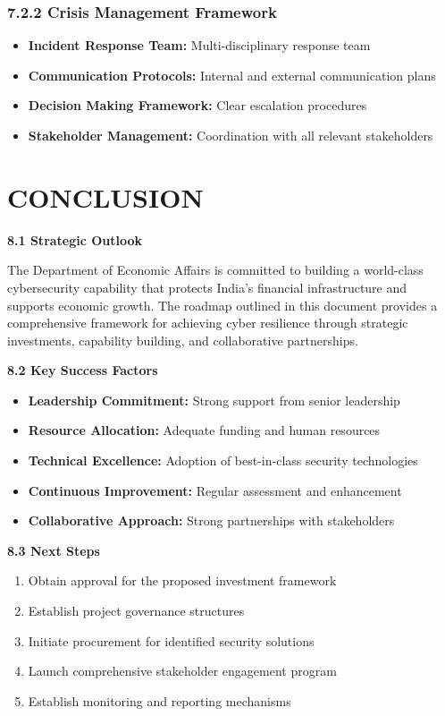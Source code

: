 \documentclass[12pt,a4paper]{report}
\newcommand{\sectionheader}[1]{\textbf{\color{govblue}#1}}
\begin{document}
\subsection*{7.2.2 Crisis Management Framework}
\begin{itemize}[leftmargin=*, itemsep=3pt]
    \item \textbf{Incident Response Team:} Multi-disciplinary response team
    \item \textbf{Communication Protocols:} Internal and external communication plans
    \item \textbf{Decision Making Framework:} Clear escalation procedures
    \item \textbf{Stakeholder Management:} Coordination with all relevant stakeholders
\end{itemize}

\chapter{CONCLUSION}

\sectionheader{8.1 Strategic Outlook}

The Department of Economic Affairs is committed to building a world-class cybersecurity capability that protects India's financial infrastructure and supports economic growth. The roadmap outlined in this document provides a comprehensive framework for achieving cyber resilience through strategic investments, capability building, and collaborative partnerships.

\sectionheader{8.2 Key Success Factors}

\begin{itemize}[leftmargin=*, itemsep=3pt]
    \item \textbf{Leadership Commitment:} Strong support from senior leadership
    \item \textbf{Resource Allocation:} Adequate funding and human resources
    \item \textbf{Technical Excellence:} Adoption of best-in-class security technologies
    \item \textbf{Continuous Improvement:} Regular assessment and enhancement
    \item \textbf{Collaborative Approach:} Strong partnerships with stakeholders
\end{itemize}

\sectionheader{8.3 Next Steps}

\begin{enumerate}[leftmargin=*, itemsep=4pt]
    \item Obtain approval for the proposed investment framework
    \item Establish project governance structures
    \item Initiate procurement for identified security solutions
    \item Launch comprehensive stakeholder engagement program
    \item Establish monitoring and reporting mechanisms
\end{enumerate}
\end{document}
